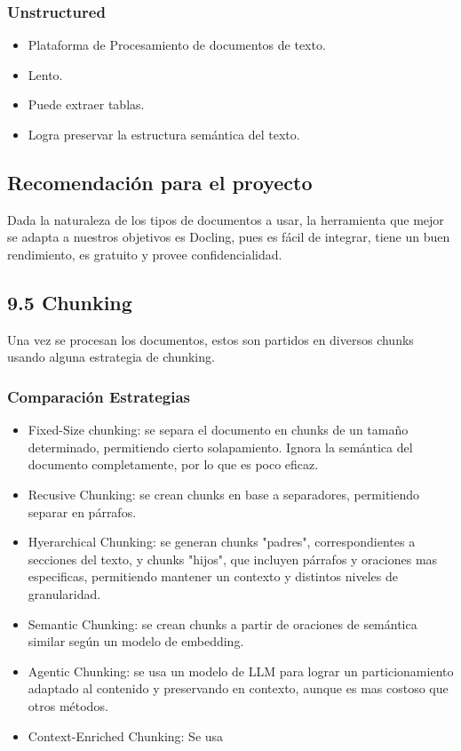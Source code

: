 \documentclass[12pt, a4paper]{report}
\begin{document}
\subsubsection*{Unstructured}
\begin{itemize}
    \item Plataforma de Procesamiento de documentos de texto.
    \item Lento.
    \item Puede extraer tablas.
    \item Logra preservar la estructura semántica del texto.
\end{itemize}

\subsection*{Recomendación para el proyecto}

Dada la naturaleza de los tipos de documentos a usar, la herramienta que mejor se adapta a nuestros objetivos es Docling, pues es fácil de integrar, tiene un buen rendimiento, es gratuito y provee confidencialidad.

\subsection*{9.5 Chunking}

Una vez se procesan los documentos, estos son partidos en diversos chunks usando alguna estrategia de chunking.

\subsubsection*{Comparación Estrategias}
\begin{itemize}
    \item Fixed-Size chunking: se separa el documento en chunks de un tamaño determinado, permitiendo cierto solapamiento. Ignora la semántica del documento completamente, por lo que es poco eficaz.
    \item Recusive Chunking: se crean chunks en base a separadores, permitiendo separar en párrafos.
    \item Hyerarchical Chunking: se generan chunks "padres", correspondientes a secciones del texto, y chunks "hijos", que incluyen párrafos y oraciones mas especificas, permitiendo mantener un contexto y distintos niveles de granularidad.
    \item Semantic Chunking: se crean chunks a partir de oraciones de semántica similar según un modelo de embedding.
    \item Agentic Chunking: se usa un modelo de LLM para lograr un particionamiento adaptado al contenido y preservando en contexto, aunque es mas costoso que otros métodos.
    \item Context-Enriched Chunking: Se usa
\end{itemize}
\end{document}
